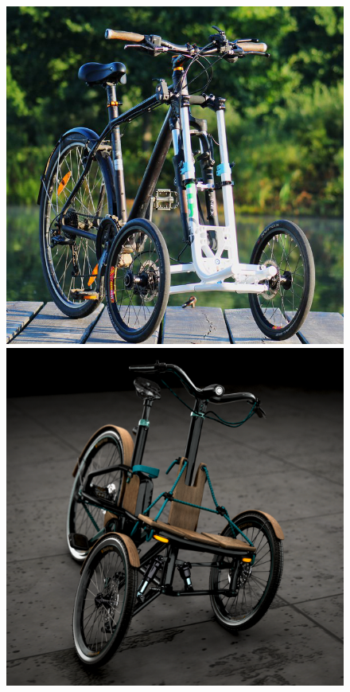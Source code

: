 \begin{figure}[!h]
		  \includegraphics[width=1.0\linewidth]{figs/02/trego}
		\endminipage\hfill
		  \includegraphics[width=1.0\linewidth]{figs/02/kaylad}

\end{figure}
